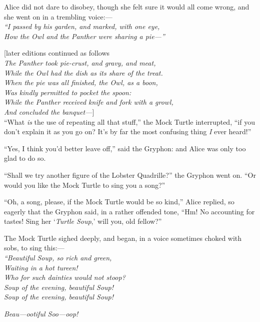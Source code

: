 \documentclass[book, 20pt]{extbook}
\begin{document}
Alice did not dare to disobey, though she felt sure it would all come
wrong, and she went on in a trembling voice:---\\
\bigskip
\noindent\emph{``I passed by his garden, and marked, with one eye,\\}
\noindent\emph{How the Owl and the Panther were sharing a pie---''\\}
\bigskip
\strut
{[}later editions continued as follows\\
\bigskip
\noindent\emph{The Panther took pie-crust, and gravy, and meat,\\}
\noindent\emph{While the Owl had the dish as its share of the treat.\\}
\noindent\emph{When the pie was all finished, the Owl, as a boon,\\}
\noindent\emph{Was kindly permitted to pocket the spoon:\\}
\noindent\emph{While the Panther received knife and fork with a growl,\\}
\noindent\emph{And concluded the banquet---}{]}\\
\bigskip
``What \emph{is} the use of repeating all that stuff,'' the Mock Turtle
interrupted, ``if you don't explain it as you go on? It's by far the
most confusing thing \emph{I} ever heard!''

``Yes, I think you'd better leave off,'' said the Gryphon: and Alice was
only too glad to do so.

``Shall we try another figure of the Lobster Quadrille?'' the Gryphon
went on. ``Or would you like the Mock Turtle to sing you a song?''

``Oh, a song, please, if the Mock Turtle would be so kind,'' Alice
replied, so eagerly that the Gryphon said, in a rather offended tone,
``Hm! No accounting for tastes! Sing her `\emph{Turtle Soup},' will you,
old fellow?''

The Mock Turtle sighed deeply, and began, in a voice sometimes choked
with sobs, to sing this:---\\
\bigskip
\noindent\emph{``Beautiful Soup, so rich and green,\\}
\noindent\emph{Waiting in a hot tureen!\\}
\noindent\emph{Who for such dainties would not stoop?\\}
\noindent\emph{Soup of the evening, beautiful Soup!\\}
\noindent\emph{Soup of the evening, beautiful Soup!\\}

\emph{Beau---ootiful Soo---oop!}
\end{document}
